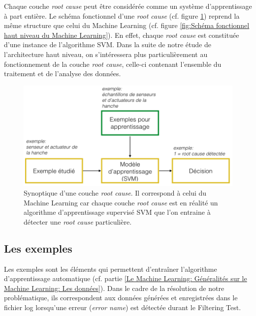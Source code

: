 Chaque couche \emph{root cause} peut être considérée comme un système d'apprentissage à part entière. Le schéma fonctionnel d'une \emph{root cause} (cf. figure 	\ref{fig:Synoptique d'une couche root cause}) reprend la même structure que celui du Machine Learning (cf. figure \ref{fig:Schéma fonctionnel haut niveau du Machine Learning}). En effet, chaque \emph{root cause} est constituée d'une instance de l'algorithme SVM. Dans la suite de notre étude de l'architecture haut niveau, on s'intéressera plus particulièrement  au fonctionnement de la couche \emph{root cause}, celle-ci contenant l'ensemble du traitement et de l'analyse des données.

\begin{figure}[h]
	\centering\includegraphics[width=13cm]{images/exemple_root.png}
	\caption[Synoptique d'une couche root cause]{Synoptique d'une couche \emph{root cause}. Il correspond à celui du Machine Learning car chaque couche \emph{root cause} est en réalité un algorithme d'apprentissage supervisé SVM que l'on entraine à détecter une \emph{root cause} particulière.}
	\label{fig:Synoptique d'une couche root cause}
\end{figure}

\subsection{Les exemples}
\label{Automatisation du processus d'investigation: Achitecture High Level du système proposé: Les exemples}
Les exemples sont les éléments qui permettent d'entraîner l'algorithme d'apprentissage automatique (cf. partie \ref{Le Machine Learning: Généralités sur le Machine Learning: Les données}). Dans le cadre de la résolution de notre problématique, ils correspondent aux données générées et enregistrées dans le fichier log lorsqu'une erreur (\emph{error name}) est détectée durant le Filtering Test.

